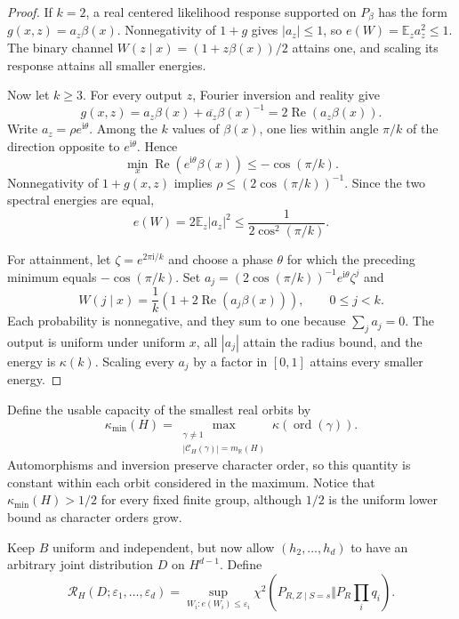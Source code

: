 \documentclass[11pt]{article}
\theoremstyle{definition}
\newcommand{\E}{\mathbb{E}}
\newcommand{\chitwo}{\chi^2}
\begin{document}
\begin{proof}
If $k=2$, a real centered likelihood response supported on $P_\beta$ has the
form $g(x,z)=a_z\beta(x)$.  Nonnegativity of $1+g$ gives $|a_z|\leq1$, so
$e(W)=\E_z a_z^2\leq1$.  The binary channel
$W(z\mid x)=(1+z\beta(x))/2$ attains one, and scaling its response attains all
smaller energies.

Now let $k\geq3$.  For every output $z$, Fourier inversion and reality give
\[
 g(x,z)=a_z\beta(x)+\overline{a_z}\beta(x)^{-1}
       =2\operatorname{Re}(a_z\beta(x)).
\]
Write $a_z=\rho e^{\mathrm{i}\theta}$.  Among the $k$ values of $\beta(x)$,
one lies within angle $\pi/k$ of the direction opposite to
$e^{\mathrm{i}\theta}$.  Hence
\[
 \min_x\operatorname{Re}(e^{\mathrm{i}\theta}\beta(x))
 \leq-\cos(\pi/k).
\]
Nonnegativity of $1+g(x,z)$ implies
$\rho\leq(2\cos(\pi/k))^{-1}$.  Since the two spectral energies are equal,
\[
 e(W)=2\E_z|a_z|^2\leq\frac{1}{2\cos^2(\pi/k)}.
\]

For attainment, let $\zeta=e^{2\pi\mathrm{i}/k}$ and choose a phase $\theta$
for which the preceding minimum equals $-\cos(\pi/k)$.  Set
$a_j=(2\cos(\pi/k))^{-1}e^{\mathrm{i}\theta}\zeta^j$ and
\[
 W(j\mid x)=\frac1k\left(1+2\operatorname{Re}(a_j\beta(x))\right),
 \qquad 0\leq j<k.
\]
Each probability is nonnegative, and they sum to one because
$\sum_j a_j=0$.  The output is uniform under uniform $x$, all $|a_j|$ attain
the radius bound, and the energy is $\kappa(k)$.  Scaling every $a_j$ by a
factor in $[0,1]$ attains every smaller energy.
\end{proof}

Define the usable capacity of the smallest real orbits by
\begin{equation}\label{eq:min-capacity}
 \kappa_{\min}(H)=
 \max_{\substack{\gamma\neq1\\
       |\mathcal C_H(\gamma)|=m_{\mathbb R}(H)}}
       \kappa(\operatorname{ord}(\gamma)).
\end{equation}
Automorphisms and inversion preserve character order, so this quantity is
constant within each orbit considered in the maximum.  Notice that
$\kappa_{\min}(H)>1/2$ for every fixed finite group, although $1/2$ is the
uniform lower bound as character orders grow.

Keep $B$ uniform and independent, but now allow $(h_2,\ldots,h_d)$ to have an
arbitrary joint distribution $D$ on $H^{d-1}$.  Define
\[
 \mathcal R_H(D;\varepsilon_1,\ldots,\varepsilon_d)
 =\sup_{W_i:e(W_i)\leq\varepsilon_i}
   \chitwo(P_{R,Z\mid S=s}\Vert P_R\prod_iq_i).
\]
\end{document}
